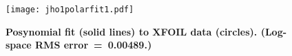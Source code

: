 \begin{figure}[H]
	\begin{center}
	\texttt{[image: jho1polarfit1.pdf]}
    \caption{\textbf{Posynomial fit (solid lines) to XFOIL data (circles).  (Log-space RMS error~=~0.00489.)}}
	\label{f:JH01polar}
	\end{center}
\end{figure}

% 
% 
% 
% 
